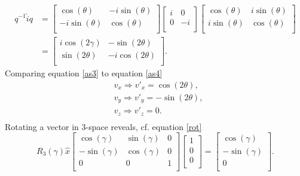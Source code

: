 \begin{equation}
	\begin{split}
		q^{-1}\hat{i}q &=\begin{bmatrix}
			\cos(\theta) & -i\sin(\theta)\\
			-i\sin(\theta) & \cos(\theta)\\
		\end{bmatrix}\begin{bmatrix}
			i & 0\\
			0& -i\\
		\end{bmatrix}\begin{bmatrix}
			\cos(\theta) & i\sin(\theta)\\
			i\sin(\theta) & \cos(\theta)\\
		\end{bmatrix}\\
		&=\begin{bmatrix}
			i\cos(2\gamma) & -\sin(2\theta)\\
			\sin(2\theta) & -i\cos(2\theta)\\
		\end{bmatrix}.
	\end{split}
	\label{as3}
\end{equation} 
Comparing equation \eqref{as3} to equation \eqref{as4}
\begin{equation}
	\begin{split}
		&v_x\Rightarrow v'_x=\cos(2\theta),\\
		&v_y\Rightarrow v'_y=-\sin(2\theta),\\
		&v_z\Rightarrow v'_z=0.\\
	\end{split}
	\label{as5}
\end{equation} 
Rotating a vector in 3-space reveals, cf. equation \eqref{rot}
\begin{equation}
	R_3(\gamma)\hat{x}
	\begin{bmatrix}
		\cos(\gamma) & \sin(\gamma) & 0 \\
		-\sin(\gamma) & \cos(\gamma) & 0\\
		0 & 0 & 1\\
	\end{bmatrix}\begin{bmatrix}
		1\\0 \\0\\
	\end{bmatrix}=\begin{bmatrix}
		\cos(\gamma)\\
		-\sin(\gamma)\\
		0\\
	\end{bmatrix}.
	\label{as6}
\end{equation} 
